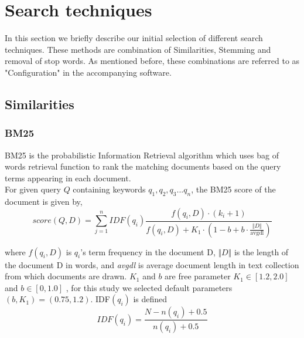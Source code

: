 \documentclass[report,draft*]{aaltoseries}
\begin{document}

\section{Search techniques}
In this section we briefly describe our initial selection of different search techniques. These methods are combination of Similarities, Stemming and removal of stop words. As mentioned before, these combinations are referred to as "Configuration" in the accompanying software. 
\subsection{Similarities}
\subsubsection{BM25}
BM25 is the probabilistic Information Retrieval algorithm which uses bag of words retrieval function to rank the matching documents based on the query terms appearing in each document.\\
For given query $Q$ containing keywords $q_1, q_2, q_3 ... q_n$, the BM25 score of the document is given by,\\

\begin{equation}
score(Q,D) = \sum_{j=1}^{n}{IDF(q_i)\frac{f(q_i,D) \cdot (k_i+1)}{f(q_i,D)+K_1 \cdot (1-b+b \cdot \frac{\Vert D \Vert}{\text{avgdl}})}}
\end{equation}

where $f(q_i, D)$ is $q_i$'s term frequency in the document D, $\Vert D \Vert$ is the length of the document D in words, and \textit{avgdl} is average document length in text collection from which documents are drawn. $K_1$ and $b$ are free parameter $K_1 \in [1.2, 2.0]$ and $b \in [0, 1.0]$ \cite{Manning08}, for this study we selected default parameters $(b,K_1)=(0.75,1.2)$. IDF$(q_i)$ is defined
\begin{equation}
IDF(q_i) = \frac{N - n(q_i) + 0.5}{n(q_i) + 0.5}
\end{equation}
\end{document}
